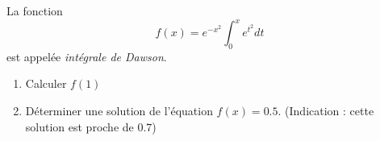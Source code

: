 \begin{exercice}\label{exoSC_serie4-0002}

	La fonction
	\begin{equation}
		f(x)= e^{-x^2}\int_0^x e^{t^2}dt
	\end{equation}
	est appelée \emph{intégrale de Dawson}.

	\begin{enumerate}

		\item
			Calculer $f(1)$
		\item
			Déterminer une solution de l'équation $f(x)=0.5$. (Indication : cette solution est proche de $0.7$)

	\end{enumerate}

\end{exercice}
